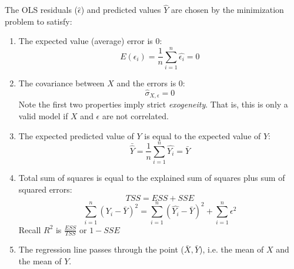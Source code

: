 \documentclass{article}
\begin{document}
The OLS residuals ($\hat{\epsilon}$) and predicted values $\hat{Y}$ are chosen by the minimization problem to satisfy: 
\begin{enumerate}
	\item The expected value (average) error is 0: 
	\begin{equation*}
	E(\epsilon_i)=\frac{1}{n}\displaystyle \sum_{i=1}^n \hat{\epsilon_i}=0	
	\end{equation*}
	\item The covariance between $X$ and the errors is 0:
	\begin{equation*}
	\hat{\sigma}_{X,\epsilon}=0	
	\end{equation*}
Note the first two properties imply strict \emph{exogeneity}. That is, this is only a valid model if $X$ and $\epsilon$ are not correlated. 
	\item The expected predicted value of $Y$ is equal to the expected value of $Y$:
	\begin{equation*}
	\bar{\hat{Y}}=\frac{1}{n} \displaystyle\sum_{i=1}^n \hat{Y_i} = \bar{Y}	
	\end{equation*}
	\item Total sum of squares is equal to the explained sum of squares plus sum of squared errors:
	\begin{equation*}
	TSS=ESS+SSE	
	\end{equation*}
	\begin{equation*}
	\sum_{i=1}^n (Y_i-\bar{Y})^2=\sum_{i=1}^n (\hat{Y_i}-\bar{Y})^2 + \sum_{i=1}^n {\epsilon}^2 	
	\end{equation*}
	Recall $R^2$ is $\frac{ESS}{TSS}$ or $1-SSE$
	\item The regression line passes through the point ($\bar{X},\bar{Y}$), i.e. the mean of $X$ and the mean of $Y$. 
\end{enumerate}
\end{document}

